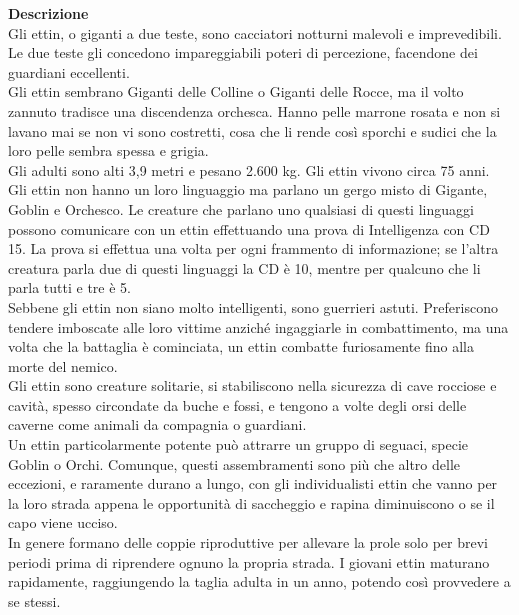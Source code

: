 \begin{multicols}{2}
\textbf{Descrizione}\\
Gli ettin, o giganti a due teste, sono cacciatori notturni malevoli e imprevedibili. Le due teste gli concedono impareggiabili poteri di percezione, facendone dei guardiani eccellenti.\\
Gli ettin sembrano Giganti delle Colline o Giganti delle Rocce, ma il volto zannuto tradisce una discendenza orchesca. Hanno pelle marrone rosata e non si lavano mai se non vi sono costretti, cosa che li rende così sporchi e sudici che la loro pelle sembra spessa e grigia.\\
Gli adulti sono alti 3,9 metri e pesano 2.600 kg. Gli ettin vivono circa 75 anni.\\
Gli ettin non hanno un loro linguaggio ma parlano un gergo misto di Gigante, Goblin e Orchesco. Le creature che parlano uno qualsiasi di questi linguaggi possono comunicare con un ettin effettuando una prova di Intelligenza con CD 15. La prova si effettua una volta per ogni frammento di informazione; se l’altra creatura parla due di questi linguaggi la CD è 10, mentre per qualcuno che li parla tutti e tre è 5.\\
Sebbene gli ettin non siano molto intelligenti, sono guerrieri astuti. Preferiscono tendere imboscate alle loro vittime anziché ingaggiarle in combattimento, ma una volta che la battaglia è cominciata, un ettin combatte furiosamente fino alla morte del nemico.\\
Gli ettin sono creature solitarie, si stabiliscono nella sicurezza di cave rocciose e cavità, spesso circondate da buche e fossi, e tengono a volte degli orsi delle caverne come animali da compagnia o guardiani.\\
Un ettin particolarmente potente può attrarre un gruppo di seguaci, specie Goblin o Orchi. Comunque, questi assembramenti sono più che altro delle eccezioni, e raramente durano a lungo, con gli individualisti ettin che vanno per la loro strada appena le opportunità di saccheggio e rapina diminuiscono o se il capo viene ucciso.\\
In genere formano delle coppie riproduttive per allevare la prole solo per brevi periodi prima di riprendere ognuno la propria strada. I giovani ettin maturano rapidamente, raggiungendo la taglia adulta in un anno, potendo così provvedere a se stessi.\\


\end{multicols}
